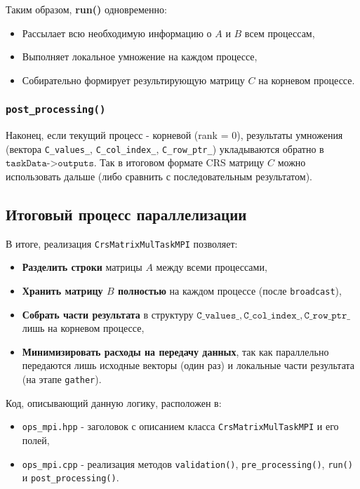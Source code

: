 \documentclass[12pt]{article}
\begin{document}
Таким образом, \textbf{run()} одновременно:
\begin{itemize}
    \item Рассылает всю необходимую информацию о \(A\) и \(B\) всем процессам,
    \item Выполняет локальное умножение на каждом процессе,
    \item Собирательно формирует результирующую матрицу \(C\) на корневом процессе.
\end{itemize}

\subsubsection{\texttt{post\_processing()}}
Наконец, если текущий процесс - корневой (rank = 0), результаты умножения (вектора \texttt{C\_values\_}, \texttt{C\_col\_index\_}, \texttt{C\_row\_ptr\_}) укладываются обратно в \(\texttt{taskData->outputs}\). Так в итоговом формате CRS матрицу \(C\) можно использовать дальше (либо сравнить с последовательным результатом).

\subsection{Итоговый процесс параллелизации}

В итоге, реализация \texttt{CrsMatrixMulTaskMPI} позволяет:
\begin{itemize}
    \item \textbf{Разделить строки} матрицы \(A\) между всеми процессами,
    \item \textbf{Хранить матрицу \(B\) полностью} на каждом процессе (после \texttt{broadcast}),
    \item \textbf{Собрать части результата} в структуру \(\texttt{C\_values\_}, \texttt{C\_col\_index\_}, \texttt{C\_row\_ptr\_}\) лишь на корневом процессе,
    \item \textbf{Минимизировать расходы на передачу данных}, так как параллельно передаются лишь исходные векторы (один раз) и локальные части результата (на этапе \texttt{gather}).
\end{itemize}

Код, описывающий данную логику, расположен в:
\begin{itemize}
    \item \texttt{ops\_mpi.hpp} - заголовок с описанием класса \texttt{CrsMatrixMulTaskMPI} и его полей,
    \item \texttt{ops\_mpi.cpp} - реализация методов \texttt{validation()}, \texttt{pre\_processing()}, \texttt{run()} и \texttt{post\_processing()}.
\end{itemize}
\end{document}
